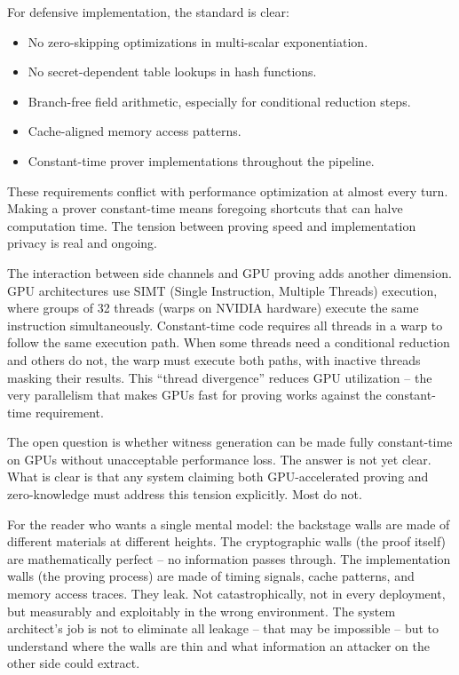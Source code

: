 \documentclass[
  11pt,
  openany]{report}
\providecommand{\tightlist}{%
  \setlength{\itemsep}{0pt}\setlength{\parskip}{0pt}}
\begin{document}
For defensive implementation, the standard is clear:

\begin{itemize}
\tightlist
\item
  No zero-skipping optimizations in multi-scalar exponentiation.
\item
  No secret-dependent table lookups in hash functions.
\item
  Branch-free field arithmetic, especially for conditional reduction steps.
\item
  Cache-aligned memory access patterns.
\item
  Constant-time prover implementations throughout the pipeline.
\end{itemize}

These requirements conflict with performance optimization at almost every turn.
Making a prover constant-time means foregoing shortcuts that can halve
computation time. The tension between proving speed and implementation privacy
is real and ongoing.

The interaction between side channels and GPU proving adds another dimension.
GPU architectures use SIMT (Single Instruction, Multiple Threads) execution,
where groups of 32 threads (warps on NVIDIA hardware) execute the same
instruction simultaneously. Constant-time code requires all threads in a warp to
follow the same execution path. When some threads need a conditional reduction
and others do not, the warp must execute both paths, with inactive threads
masking their results. This ``thread divergence'' reduces GPU utilization -- the
very parallelism that makes GPUs fast for proving works against the
constant-time requirement.

The open question is whether witness generation can be made fully constant-time
on GPUs without unacceptable performance loss. The answer is not yet clear. What
is clear is that any system claiming both GPU-accelerated proving and
zero-knowledge must address this tension explicitly. Most do not.

For the reader who wants a single mental model: the backstage walls are made of
different materials at different heights. The cryptographic walls (the proof
itself) are mathematically perfect -- no information passes through. The
implementation walls (the proving process) are made of timing signals, cache
patterns, and memory access traces. They leak. Not catastrophically, not in
every deployment, but measurably and exploitably in the wrong environment. The
system architect's job is not to eliminate all leakage -- that may be impossible
-- but to understand where the walls are thin and what information an attacker
on the other side could extract.
\end{document}
